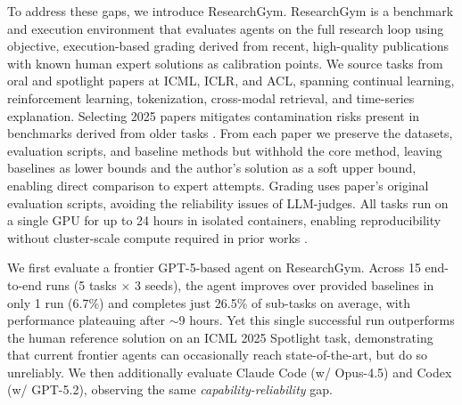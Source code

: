 \documentclass[11pt]{article}
\let\cite\citep
\theoremstyle{plain}
\theoremstyle{definition}
\theoremstyle{remark}
\begin{document}
To address these gaps, we introduce ResearchGym.
ResearchGym is a benchmark and execution environment that evaluates agents on the full research loop using objective, execution-based grading derived from recent, high-quality publications with known
  human expert solutions as calibration points.
We source tasks from oral and spotlight papers at ICML, ICLR, and ACL, spanning continual learning, reinforcement learning, tokenization, cross-modal retrieval, and time-series explanation. Selecting 2025 papers mitigates contamination risks present in benchmarks derived from older tasks \cite{nathani2025mlgymnewframeworkbenchmark, zou2025fmlbenchbenchmarkautomaticml}. From each paper we preserve the datasets, evaluation scripts, and baseline methods but withhold the core method, leaving baselines as lower bounds and the author's solution as a soft upper bound, enabling direct comparison to expert attempts. Grading uses paper's original evaluation scripts, avoiding the reliability issues of LLM-judges. All tasks run on a single GPU for up to 24 hours in isolated containers, enabling reproducibility without cluster-scale compute required in prior works \cite{nathani2025mlgymnewframeworkbenchmark, wu2025innovatorbenchevaluatingagentsability, wijk2025rebench}.

We first evaluate a frontier GPT-5-based agent on ResearchGym. Across 15 end-to-end runs (5 tasks $\times$ 3 seeds), the agent improves over provided baselines in only 1 run (6.7\%) and completes just 26.5\% of sub-tasks on average, with performance plateauing after $\sim$9 hours. Yet this single successful run outperforms the human reference solution on an ICML 2025 Spotlight task, demonstrating that current frontier agents can occasionally reach 
state-of-the-art, but do so unreliably. 
We then additionally evaluate Claude Code (w/ Opus-4.5) and Codex (w/ GPT-5.2), observing the same \emph{capability-reliability} gap.



\end{document}
